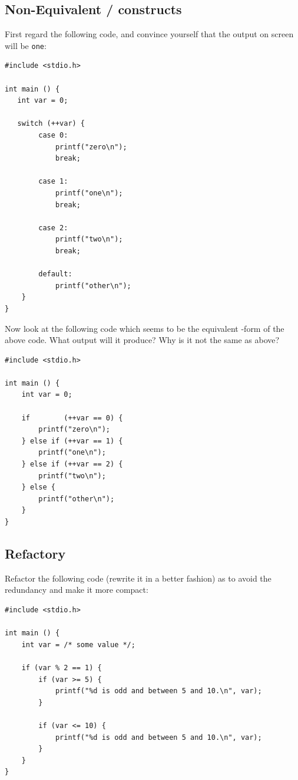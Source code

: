 \subsection*{Non-Equivalent / constructs}
First regard the following code, and convince yourself that the output on screen will be \texttt{one}:
\begin{codebox}[exo5-5a.c]
\begin{verbatim}
#include <stdio.h>

int main () {
   int var = 0;

   switch (++var) {
        case 0:
            printf("zero\n");
            break;

        case 1:
            printf("one\n");
            break;

        case 2:
            printf("two\n");
            break;

        default:
            printf("other\n");
    }
}
\end{verbatim}
\end{codebox}

Now look at the following code which seems to be the equivalent -form of the above code. What output will it produce? Why is it not the same as above?
\begin{codebox}[exo5-5b.c]
\begin{verbatim}
#include <stdio.h>

int main () {
    int var = 0;

    if        (++var == 0) {
        printf("zero\n");
    } else if (++var == 1) {
        printf("one\n");
    } else if (++var == 2) {
        printf("two\n");
    } else {
        printf("other\n");
    }
}
\end{verbatim}
\end{codebox}
\vfill

\subsection*{Refactory}
Refactor the following code (\ie rewrite it in a better fashion) as to avoid the redundancy and make it more compact:
\begin{codebox}[exo5-6.c]
\begin{verbatim}
#include <stdio.h>

int main () {
    int var = /* some value */;

    if (var % 2 == 1) {
        if (var >= 5) {
            printf("%d is odd and between 5 and 10.\n", var);
        }
        
        if (var <= 10) {
            printf("%d is odd and between 5 and 10.\n", var);
        }
    }
}
\end{verbatim}
\end{codebox}

